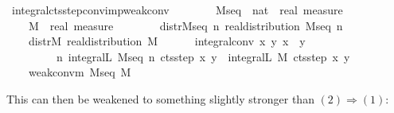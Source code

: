 \documentclass[leqno]{article}
\theoremstyle{definition}
\begin{document}
\begin{isabellebody}
\isamarkupfalse%
\ integral{\isacharunderscore}cts{\isacharunderscore}step{\isacharunderscore}conv{\isacharunderscore}imp{\isacharunderscore}weak{\isacharunderscore}conv{\isacharcolon}\isanewline
\ \ \ \isanewline
\ \ \ \ M{\isacharunderscore}seq\ {\isacharcolon}{\isacharcolon}\ {\isachardoublequoteopen}nat\ {\isasymRightarrow}\ real\ measure{\isachardoublequoteclose}\ \isanewline
\ \ \ \ M\ {\isacharcolon}{\isacharcolon}\ {\isachardoublequoteopen}real\ measure{\isachardoublequoteclose}\isanewline
\ \ \ \isanewline
\ \ \ \ distr{\isacharunderscore}M{\isacharunderscore}seq{\isacharcolon}\ {\isachardoublequoteopen}{\isasymAnd}n{\isachardot}\ real{\isacharunderscore}distribution\ {\isacharparenleft}M{\isacharunderscore}seq\ n{\isacharparenright}{\isachardoublequoteclose}\ \ \isanewline
\ \ \ \ distr{\isacharunderscore}M{\isacharcolon}\ {\isachardoublequoteopen}real{\isacharunderscore}distribution\ M{\isachardoublequoteclose}\ \ \isanewline
\ \ \ \ integral{\isacharunderscore}conv{\isacharcolon}\ {\isachardoublequoteopen}{\isasymAnd}x\ y{\isachardot}\ x\ {\isacharless}\ y\ {\isasymLongrightarrow}\isanewline
\ \ \ \ \ \ \ \ \ {\isacharparenleft}{\isasymlambda}n{\isachardot}\ integral\isactrlsup L\ {\isacharparenleft}M{\isacharunderscore}seq\ n{\isacharparenright}\ {\isacharparenleft}cts{\isacharunderscore}step\ x\ y{\isacharparenright}{\isacharparenright}\ {\isacharminus}{\isacharminus}{\isacharminus}{\isacharminus}{\isachargreater}\ integral\isactrlsup L\ M\ {\isacharparenleft}cts{\isacharunderscore}step\ x\ y{\isacharparenright}{\isachardoublequoteclose}\isanewline
\ \ \ \isanewline
\ \ \ \ {\isachardoublequoteopen}weak{\isacharunderscore}conv{\isacharunderscore}m\ M{\isacharunderscore}seq\ M{\isachardoublequoteclose}\isanewline
\end{isabellebody}

\medskip

This can then be weakened to something slightly stronger than $(2) \Longrightarrow (1)$:

\medskip
\end{document}
